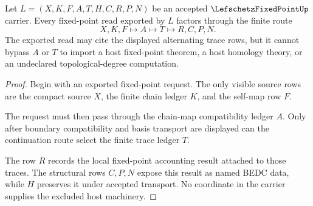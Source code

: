 \begin{theorem}
\label{thm:lefschetz-fixed-point-finite-trace-ledger}
Let $L=(X,K,F,A,T,H,C,R,P,N)$ be an accepted $\LefschetzFixedPointUp$ carrier. Every fixed-point read exported by $L$ factors through the finite route
$$
X,K,F \longmapsto A \longmapsto T \longmapsto R,C,P,N .
$$
The exported read may cite the displayed alternating trace rows, but it cannot bypass $A$ or $T$ to import a host fixed-point theorem, a host homology theory, or an undeclared topological-degree computation.
\end{theorem}
\begin{proof}
Begin with an exported fixed-point request. The only visible source rows are the compact source $X$, the finite chain ledger $K$, and the self-map row $F$.

The request must then pass through the chain-map compatibility ledger $A$. Only after boundary compatibility and basis transport are displayed can the continuation route select the finite trace ledger $T$.

The row $R$ records the local fixed-point accounting result attached to those traces. The structural rows $C,P,N$ expose this result as named BEDC data, while $H$ preserves it under accepted transport. No coordinate in the carrier supplies the excluded host machinery.
\end{proof}


\begin{closurestatus}{\LefschetzFixedPointUp}
  \theoryclosure{\seedClosure}
  \formalstatus{\unformalizedV}
\end{closurestatus}
